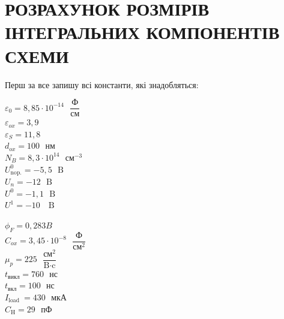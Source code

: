 \documentclass[a4paper,14pt]{extreport}
\begin{document}
\newpage
\chapter{РОЗРАХУНОК РОЗМІРІВ ІНТЕГРАЛЬНИХ КОМПОНЕНТІВ СХЕМИ }
	Перш за все запишу всі константи, які знадобляться:\\
	\vspace{0.2cm}
	\begin{minipage}{0.5\textwidth}
	    \begin{flushleft}
	  	\vspace{0.2cm}
	  $\varepsilon_{0}=8,85 \cdot 10^{-14} \text{ }\dfrac{\text{Ф}}{\text{см}}$\\
	  \vspace{0.2cm}
	  $\varepsilon_{ox}=3,9$\\
	  \vspace{0.2cm}
	  $\varepsilon_{S}=11,8$\\
	  \vspace{0.2cm}
	  $ d_{o x}=100 \text{ } \text{нм}$\\
	  \vspace{0.2cm}
	  $ N_{B}=8,3 \cdot 10^{14}\text{ } \text{см}^{-3}$\\
	  \vspace{0.2cm}
	  $ U_{\text{nop.}}^{0}=-5,5 \text{ }\text{B}$\\
	  \vspace{0.2cm}
	  $ U_{n}=-12 \text{ }\text{B}$\\
	  \vspace{0.2cm}
	  $U^{0}=-1,1 \text{ }\text{B}$\\
	  \vspace{0.2cm}
	  $U^{1}=-10 \text{ }\text{~B}$\\
	    \end{flushleft}
	  \end{minipage}
	  \begin{minipage}{0.3\textwidth}
	    \begin{flushright}
	    $\phi_{F}=0,283 B$\\
	    \vspace{0.2cm}
	    $C_{ox}=3,45 \cdot 10^{-8} \text{ }\dfrac{\text{Ф}}{\text{см}^{2}}$\\
	    \vspace{0.2cm}
	    $\mu_{p} = 225 \text{ }\dfrac{\text{см}^{2}}{\text{B}\cdot\text{c}}$\\
	    \vspace{0.2cm}
	    $t_{\text{викл}} = 760 \text{ }\text{нс}$\\
	    \vspace{0.2cm}
	    $ t_{\text{вкл}}= 100 \text{ }\text{нс}$\\
	    \vspace{0.2cm} 
	    $ I_{\text {load }}= 430\text{ } \text{мкА}$\\
	    \vspace{0.2cm}
	    $ C_{\text {H}}= 29\text{ } \text{пФ}$\\
	    \vspace{0.2cm}
	    \end{flushright}
	\end{minipage}
\end{document}
